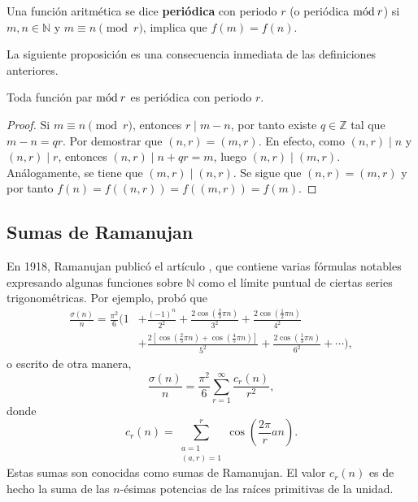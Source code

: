 \begin{definition}
Una función aritmética se dice \textbf{periódica} con periodo $r$ (o periódica $\mathrm{m\acute{o}d\:}r$) si $m, n \in \mathbb{N}$ y $m \equiv n \pmod{r}$, implica que $f(m)=f(n)$.
\end{definition}

La siguiente proposición es una consecuencia inmediata de las definiciones anteriores.

\begin{proposition}\label{prop:mod->per}
Toda función par $\mathrm{m\acute{o}d\:}r$ es periódica con periodo $r$.
\end{proposition}
\begin{proof}
Si $m \equiv n \pmod{r}$, entonces $r \mid m-n$, por tanto existe $q \in \mathbb{Z}$ tal que $m-n=q r$. Por demostrar que $(n,r)=(m,r)$. En efecto, como $(n,r) \mid n$ y $(n,r) \mid r$, entonces $(n,r) \mid n+qr=m$, luego $(n,r) \mid (m,r)$. Análogamente, se tiene que $(m,r) \mid (n,r)$. Se sigue que $(n,r)=(m,r)$ y por tanto $f(n)=f((n,r))=f((m,r))=f(m)$.
\end{proof}

\subsection{Sumas de Ramanujan}

En 1918, Ramanujan publicó el artículo \cite{Ram1}, que contiene varias fórmulas notables expresando algunas funciones sobre $\mathbb{N}$ como el límite puntual de ciertas series trigonométricas. Por ejemplo, probó que
\begin{align*}
    \frac{\sigma(n)}{n} = \frac{\pi^2}{6} \bigg( 1 & + \frac{(-1)^n}{2^2} + \frac{2 \cos \left( \frac{2}{3} \pi n \right)}{3^2} + \frac{2 \cos \left( \frac{1}{2} \pi n \right)}{4^2} \\
                                                   & + \frac{2 \left[ \cos \left( \frac{2}{5}\pi n \right) + \cos \left( \frac{4}{5} \pi n \right) \right]}{5^2} + \frac{2 \cos \left(  \frac{1}{3} \pi n \right)}{6^2} + \cdots \bigg),
\end{align*}
o escrito de otra manera,
\begin{equation*}
    \frac{\sigma(n)}{n} = \frac{\pi^2}{6} \sum_{r=1}^{\infty} \frac{c_r(n)}{r^2},
\end{equation*}
donde
\begin{equation*}
    c_r(n) = \sum_{\substack{a=1 \\ (a,r)=1}}^{r} \cos \left( \frac{2 \pi}{r} a n \right).
\end{equation*}
Estas sumas son conocidas como \textrm{sumas de Ramanujan}. El valor $c_r(n)$ es de hecho la suma de las $n$-ésimas potencias de las raíces primitivas de la unidad.

